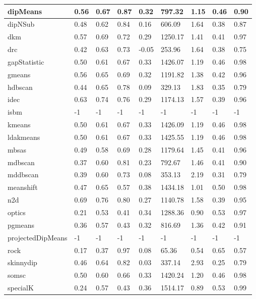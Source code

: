 \begin{table}[H]
\begin{tabular}{|l|l|l|l|l|l|l|l|l|}
\hline
dipMeans & 0.56 & 0.67 & 0.87 & 0.32 & 797.32 & 1.15 & 0.46 & 0.90 \\
\hline
dipNSub & 0.48 & 0.62 & 0.84 & 0.16 & 606.09 & 1.64 & 0.38 & 0.87 \\
\hline
dkm & 0.57 & 0.69 & 0.72 & 0.29 & 1250.17 & 1.41 & 0.41 & 0.97 \\
\hline
drc & 0.42 & 0.63 & 0.73 & -0.05 & 253.96 & 1.64 & 0.38 & 0.75 \\
\hline
gapStatistic & 0.50 & 0.61 & 0.67 & 0.33 & 1426.07 & 1.19 & 0.46 & 0.98 \\
\hline
gmeans & 0.56 & 0.65 & 0.69 & 0.32 & 1191.82 & 1.38 & 0.42 & 0.96 \\
\hline
hdbscan & 0.44 & 0.65 & 0.78 & 0.09 & 329.13 & 1.83 & 0.35 & 0.79 \\
\hline
idec & 0.63 & 0.74 & 0.76 & 0.29 & 1174.13 & 1.57 & 0.39 & 0.96 \\
\hline
isbm & -1 & -1 & -1 & -1 & -1 & -1 & -1 & -1 \\
\hline
kmeans & 0.50 & 0.61 & 0.67 & 0.33 & 1426.09 & 1.19 & 0.46 & 0.98 \\
\hline
ldakmeans & 0.50 & 0.61 & 0.67 & 0.33 & 1425.55 & 1.19 & 0.46 & 0.98 \\
\hline
mbsas & 0.49 & 0.58 & 0.69 & 0.28 & 1179.64 & 1.45 & 0.41 & 0.96 \\
\hline
mdbscan & 0.37 & 0.60 & 0.81 & 0.23 & 792.67 & 1.46 & 0.41 & 0.90 \\
\hline
mddbscan & 0.39 & 0.60 & 0.73 & 0.08 & 353.13 & 2.19 & 0.31 & 0.79 \\
\hline
meanshift & 0.47 & 0.65 & 0.57 & 0.38 & 1434.18 & 1.01 & 0.50 & 0.98 \\
\hline
n2d & 0.69 & 0.76 & 0.80 & 0.27 & 1140.78 & 1.58 & 0.39 & 0.95 \\
\hline
optics & 0.21 & 0.53 & 0.41 & 0.34 & 1288.36 & 0.90 & 0.53 & 0.97 \\
\hline
pgmeans & 0.36 & 0.57 & 0.43 & 0.32 & 816.69 & 1.36 & 0.42 & 0.91 \\
\hline
projectedDipMeans & -1 & -1 & -1 & -1 & -1 & -1 & -1 & -1 \\
\hline
rock & 0.17 & 0.37 & 0.97 & 0.08 & 65.36 & 0.54 & 0.65 & 0.57 \\
\hline
skinnydip & 0.46 & 0.64 & 0.82 & 0.03 & 337.14 & 2.93 & 0.25 & 0.79 \\
\hline
somsc & 0.50 & 0.60 & 0.66 & 0.33 & 1420.24 & 1.20 & 0.46 & 0.98 \\
\hline
specialK & 0.24 & 0.57 & 0.43 & 0.36 & 1514.17 & 0.89 & 0.53 & 0.99 \\

\end{tabular}
\end{table}
